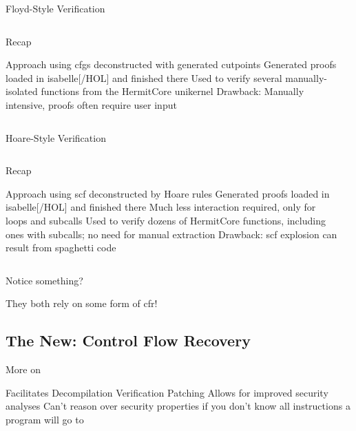 \begin{frame}{Floyd-Style Verification}
  \begin{columns}
    \begin{block}{Recap}
      \begin{outline}
        \1 Approach using \glspl{cfg} deconstructed with generated \alert{cutpoints}
        \1 Generated proofs loaded in \gls{isabelle}[/HOL] and finished there
        \1 Used to verify several manually-isolated functions from \alert{the HermitCore unikernel}
        \1 Drawback: Manually intensive, proofs often require user input
      \end{outline}
    \end{block}

    \begin{example}
    \end{example}
  \end{columns}
\end{frame}

\begin{frame}{Hoare-Style Verification}
  \begin{columns}
    \begin{block}{Recap}
      \begin{outline}
        \1 Approach using \gls{scf} deconstructed by \alert{Hoare rules}
        \1 Generated proofs loaded in \gls{isabelle}[/HOL] and finished there
        \2 Much less interaction required, only for loops and subcalls
        \1 Used to verify dozens of HermitCore functions, including ones with subcalls; no need for manual extraction
        \1 Drawback: \gls{scf} explosion can result from spaghetti code
      \end{outline}
    \end{block}

    \begin{example}
    \end{example}
  \end{columns}
\end{frame}

\begin{frame}{Notice something?}
  \begin{center}
    They both rely on some form of \gls{cfr}!
  \end{center}
\end{frame}

\subsection{The New: Control Flow Recovery}
\begin{frame}{More on }
  \begin{outline}
    \1 Facilitates
      \2 Decompilation
      \2 Verification
      \2 Patching
    \1 Allows for improved security analyses
      \2 Can't reason over security properties if you don't know all instructions a program will go to
  \end{outline}
\end{frame}
